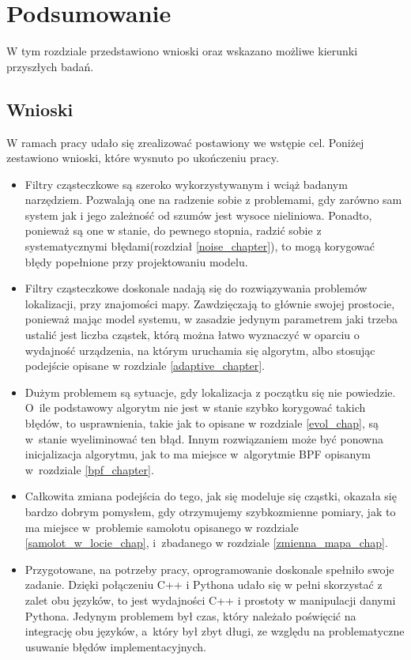 \chapter{Podsumowanie}
W tym rozdziale przedstawiono wnioski oraz wskazano możliwe kierunki przyszłych badań.
\section{Wnioski}
W ramach pracy udało się zrealizować postawiony we wstępie cel. Poniżej zestawiono wnioski, które wysnuto po ukończeniu pracy.
\begin{itemize}
	\item Filtry cząsteczkowe są szeroko wykorzystywanym i wciąż badanym narzędziem. Pozwalają one na radzenie sobie z problemami, gdy zarówno sam system jak i jego zależność od szumów jest wysoce nieliniowa. Ponadto, ponieważ są one w stanie, do pewnego stopnia, radzić sobie z systematycznymi błędami(rozdział \ref{noise_chapter}), to mogą korygować błędy popełnione przy projektowaniu modelu.
	\item Filtry cząsteczkowe doskonale nadają się do rozwiązywania problemów lokalizacji, przy znajomości mapy. Zawdzięczają to głównie swojej prostocie, ponieważ mając model systemu, w zasadzie jedynym parametrem jaki trzeba ustalić jest liczba cząstek, którą można łatwo wyznaczyć w oparciu o wydajność urządzenia, na którym uruchamia się algorytm, albo stosując podejście opisane w rozdziale \ref{adaptive_chapter}.
	\item Dużym problemem są sytuacje, gdy lokalizacja z początku się nie powiedzie. O~ile podstawowy algorytm nie jest w stanie szybko korygować takich błędów, to usprawnienia, takie jak to opisane w rozdziale \ref{evol_chap}, są w~stanie wyeliminować ten błąd. Innym rozwiązaniem może być ponowna inicjalizacja algorytmu, jak to ma miejsce w~algorytmie BPF opisanym w~rozdziale \ref{bpf_chapter}.
	\item Całkowita zmiana podejścia do tego, jak się modeluje się cząstki, okazała się bardzo dobrym pomysłem, gdy otrzymujemy szybkozmienne pomiary, jak to ma miejsce w~problemie samolotu opisanego w rozdziale \ref{samolot_w_locie_chap}, i~zbadanego w rozdziale \ref{zmienna_mapa_chap}.
	\item Przygotowane, na potrzeby pracy, oprogramowanie doskonale spełniło swoje zadanie. Dzięki połączeniu C++ i Pythona udało się w pełni skorzystać z zalet obu języków, to jest wydajności C++ i prostoty w manipulacji danymi Pythona. Jedynym problemem był czas, który należało poświęcić na integrację obu języków, a~który był zbyt długi, ze względu na problematyczne usuwanie błędów implementacyjnych.
\end{itemize}

